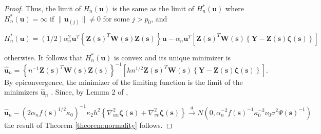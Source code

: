 \documentclass[authoryear,review, 12pt]{elsarticle}
\begin{document}
\begin{proof}
Thus, the limit of $H_{n}(\bm{u})$ is the same as the limit of $H_{n}^{*}(\bm{u})$
where $H_{n}^{*}(\bm{u})=\infty$ if $\|\bm{u}_{(j)}\|\ne0$ for some
$j>p_{0}$, and 

\[
H_{n}^{*}(\bm{u})=(1/2)\alpha_{n}^{2}\bm{u}^{T}\left\{ \bm{Z}(\bm{s})^{T}\bm{W}\!(\bm{s})\bm{Z}(\bm{s})\right\} \bm{u}-\alpha_{n}\bm{u}^{T}\left[\bm{Z}(\bm{s})^{T}\bm{W}\!(\bm{s})\left\{ \bm{Y}-\bm{Z}(\bm{s})\bm{\zeta}(\bm{s})\right\} \right]
\]


otherwise. It follows that $H_{n}^{*}(\bm{u})$ is convex and its
unique minimizer is 
\[
\hat{\bm{u}}_{n}=\left\{ n^{-1}\bm{Z}(\bm{s})^{T}\bm{W}\!(\bm{s})\bm{Z}(\bm{s})\right\} ^{-1}\left[hn^{1/2}\bm{Z}(\bm{s})^{T}\bm{W}\!(\bm{s})\left\{ \bm{Y}-\bm{Z}(\bm{s})\bm{\zeta}(\bm{s})\right\} \right].
\]
By epiconvergence, the minimizer of the limiting function is the limit
of the minimizers $\hat{\bm{u}}_{n}$ \citep{Geyer-1994,Knight-Fu-2000}.
Since, by Lemma 2 of \citet{Sun-Yan-Zhang-Lu-2014},

\[
\hat{\bm{u}}_{n}-\left(2\alpha_{n}f(\bm{s})^{1/2}\kappa_{0}\right)^{-1}\kappa_{2}h^{2}\left\{ \nabla_{uu}^{2}\bm{\zeta}(\bm{s})+\nabla_{vv}^{2}\bm{\zeta}(\bm{s})\right\} \xrightarrow{d}N\left(0,\alpha_{n}^{-2}f(\bm{s})^{-1}\kappa_{0}^{-2}\nu_{0}\sigma^{2}\Psi(\bm{s})^{-1}\right)
\]
the result of Theorem \ref{theorem:normality} follows.
\end{proof}
\end{document}
